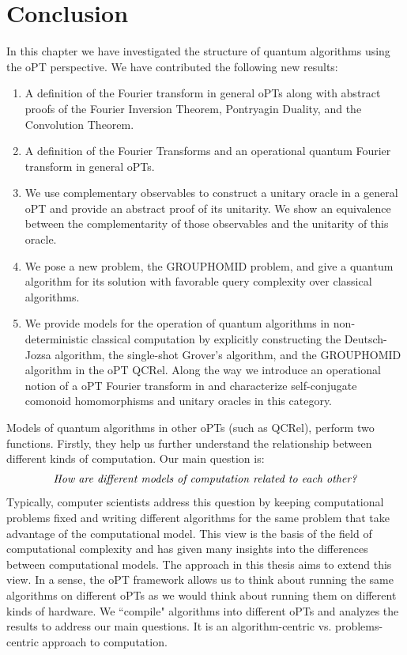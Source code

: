 \section{Conclusion}
In this chapter we have investigated the structure of quantum algorithms using the oPT perspective. We have contributed the following new results:
\begin{enumerate}
\item A definition of the Fourier transform in general oPTs along with abstract proofs of the Fourier Inversion Theorem, Pontryagin Duality, and the Convolution Theorem.
\item A definition of the Fourier Transforms and an operational quantum Fourier transform in general oPTs.
\item We use complementary observables to construct a unitary oracle in a general oPT and provide an abstract proof of its unitarity.  We show an equivalence between the complementarity of those observables and the unitarity of this oracle.
\item We pose a new problem, the GROUPHOMID problem, and give a quantum algorithm for its solution with favorable query complexity over classical algorithms.
\item We provide models for the operation of quantum algorithms in non-deterministic classical computation by explicitly constructing the Deutsch-Jozsa algorithm, the single-shot Grover's algorithm, and the GROUPHOMID algorithm in the oPT QCRel. Along the way we introduce an operational notion of a oPT Fourier transform in  and characterize self-conjugate comonoid homomorphisms and unitary oracles in this category.
\end{enumerate}

Models of quantum algorithms in other oPTs (such as QCRel), perform two functions. Firstly, they help us further understand the relationship between different kinds of computation.  Our main question is: 
\begin{align*}
\mbox{\emph{How are different models of computation related to each other?}}
\end{align*}  Typically, computer scientists address this question by keeping computational problems fixed and writing different algorithms for the same problem that take advantage of the computational model. This view is the basis of the field of computational complexity and has given many insights into the differences between computational models. The approach in this thesis aims to extend this view. In a sense, the oPT framework allows us to think about running the same algorithms on different oPTs as we would think about running them on different kinds of hardware. We ``compile" algorithms into different oPTs and analyzes the results to address our main questions. It is an algorithm-centric vs. problems-centric approach to computation. 

